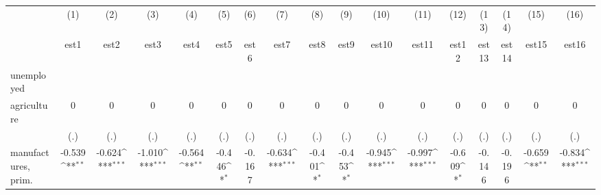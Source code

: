 {
\def\sym#1{\ifmmode^{#1}\else\(^{#1}\)\fi}
\begin{tabular}{l*{16}{c}}
\hline\hline
                    &\multicolumn{1}{c}{(1)}&\multicolumn{1}{c}{(2)}&\multicolumn{1}{c}{(3)}&\multicolumn{1}{c}{(4)}&\multicolumn{1}{c}{(5)}&\multicolumn{1}{c}{(6)}&\multicolumn{1}{c}{(7)}&\multicolumn{1}{c}{(8)}&\multicolumn{1}{c}{(9)}&\multicolumn{1}{c}{(10)}&\multicolumn{1}{c}{(11)}&\multicolumn{1}{c}{(12)}&\multicolumn{1}{c}{(13)}&\multicolumn{1}{c}{(14)}&\multicolumn{1}{c}{(15)}&\multicolumn{1}{c}{(16)}\\
                    &\multicolumn{1}{c}{est1}&\multicolumn{1}{c}{est2}&\multicolumn{1}{c}{est3}&\multicolumn{1}{c}{est4}&\multicolumn{1}{c}{est5}&\multicolumn{1}{c}{est6}&\multicolumn{1}{c}{est7}&\multicolumn{1}{c}{est8}&\multicolumn{1}{c}{est9}&\multicolumn{1}{c}{est10}&\multicolumn{1}{c}{est11}&\multicolumn{1}{c}{est12}&\multicolumn{1}{c}{est13}&\multicolumn{1}{c}{est14}&\multicolumn{1}{c}{est15}&\multicolumn{1}{c}{est16}\\
\hline
unemployed          &                     &                     &                     &                     &                     &                     &                     &                     &                     &                     &                     &                     &                     &                     &                     &                     \\
agriculture         &           0         &           0         &           0         &           0         &           0         &           0         &           0         &           0         &           0         &           0         &           0         &           0         &           0         &           0         &           0         &           0         \\
                    &         (.)         &         (.)         &         (.)         &         (.)         &         (.)         &         (.)         &         (.)         &         (.)         &         (.)         &         (.)         &         (.)         &         (.)         &         (.)         &         (.)         &         (.)         &         (.)         \\
[1em]
manufactures, prim. &      -0.539\sym{**} &      -0.624\sym{***}&      -1.010\sym{***}&      -0.564\sym{**} &      -0.446\sym{*}  &      -0.167         &      -0.634\sym{***}&      -0.401\sym{*}  &      -0.453\sym{*}  &      -0.945\sym{***}&      -0.997\sym{***}&      -0.609\sym{*}  &      -0.146         &      -0.196         &      -0.659\sym{**} &      -0.834\sym{***}\\

\end{tabular}}
